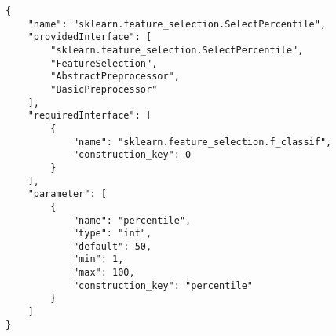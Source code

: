 \begin{verbatim}
{
    "name": "sklearn.feature_selection.SelectPercentile",
    "providedInterface": [
        "sklearn.feature_selection.SelectPercentile",
        "FeatureSelection",
        "AbstractPreprocessor",
        "BasicPreprocessor"
    ],
    "requiredInterface": [
        {
            "name": "sklearn.feature_selection.f_classif",
            "construction_key": 0
        }
    ],
    "parameter": [
        {
            "name": "percentile",
            "type": "int",
            "default": 50,
            "min": 1,
            "max": 100,
            "construction_key": "percentile"
        }
    ]
}
\end{verbatim}

